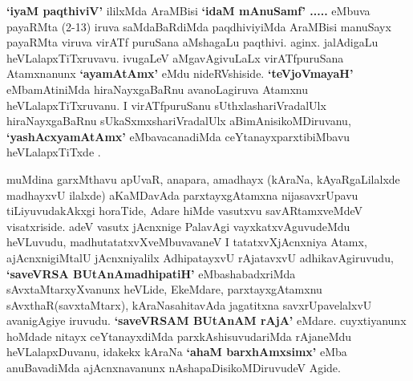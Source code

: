 \centerline{}

\begin{artha}
\textbf{`iyaM paqthiviV'} ililxMda AraMBisi \textbf{`idaM mAnuSamf' .....} eMbuva payaRMta (2-13) iruva saMdaBaRdiMda paqdhiviyiMda AraMBisi manuSayx payaRMta viruva virATf puruSana aMshagaLu paqthivi. aginx. jalAdigaLu heVLalapxTiTxruvavu. ivugaLeV aMgavAgivuLaLx virATfpuruSana Atamxnanunx \textbf{`ayamAtAmx'} eMdu nideRVshiside. \textbf{`teVjoVmayaH'} eMbamAtiniMda hiraNayxgaBaRnu avanoLagiruva Atamxnu heVLalapxTiTxruvanu. I virATfpuruSanu sUthxlashariVradalUlx hiraNayxgaBaRnu sUkaSxmxshariVradalUlx aBimAnisikoMDiruvanu, \textbf{`yashAcxyamAtAmx'} eMbavacanadiMda ceYtanayxparxtibiMbavu heVLalapxTiTxde .
\end{artha}

\begin{artha}
 muMdina garxMthavu apUvaR, anapara, amadhayx (kAraNa, kAyaRgaLilalxde madhayxvU ilalxde) aKaMDavAda parxtayxgAtamxna nijasavxrUpavu tiLiyuvudakAkxgi horaTide, Adare hiMde vasutxvu savARtamxveMdeV visatxriside. adeV vasutx jAcnxnige PalavAgi vayxkatxvAguvudeMdu heVLuvudu, madhutatatxvXveMbuvavaneV I tatatxvXjAcnxniya Atamx, ajAcnxnigiMtalU jAcnxniyalilx AdhipatayxvU rAjatavxvU adhikavAgiruvudu, \textbf{`saveVRSA BUtAnAmadhipatiH'} eMbashabadxriMda sAvxtaMtarxyXvanunx heVLide, EkeMdare, parxtayxgAtamxnu sAvxthaR(savxtaMtarx), kAraNasahitavAda jagatitxna savxrUpavelalxvU avanigAgiye iruvudu. 
 \textbf{`saveVRSAM BUtAnAM rAjA'} eMdare. cuyxtiyanunx hoMdade nitayx ceYtanayxdiMda parxkAshisuvudariMda rAjaneMdu heVLalapxDuvanu, idakekx kAraNa \textbf{`ahaM barxhAmxsimx'} eMba anuBavadiMda ajAcnxnavanunx nAshapaDisikoMDiruvudeV Agide.
\end{artha}

